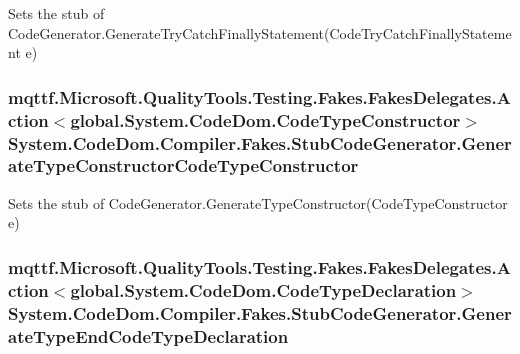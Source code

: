 Sets the stub of Code\-Generator.\-Generate\-Try\-Catch\-Finally\-Statement(\-Code\-Try\-Catch\-Finally\-Statement e)

\hypertarget{class_system_1_1_code_dom_1_1_compiler_1_1_fakes_1_1_stub_code_generator_a56afb5d726d0d976a47a78705684904e}{
\subsubsection[{Generate\-Type\-Constructor\-Code\-Type\-Constructor}]{\setlength{\rightskip}{0pt plus 5cm}mqttf.\-Microsoft.\-Quality\-Tools.\-Testing.\-Fakes.\-Fakes\-Delegates.\-Action$<$global.\-System.\-Code\-Dom.\-Code\-Type\-Constructor$>$ System.\-Code\-Dom.\-Compiler.\-Fakes.\-Stub\-Code\-Generator.\-Generate\-Type\-Constructor\-Code\-Type\-Constructor}}\label{class_system_1_1_code_dom_1_1_compiler_1_1_fakes_1_1_stub_code_generator_a56afb5d726d0d976a47a78705684904e}


Sets the stub of Code\-Generator.\-Generate\-Type\-Constructor(\-Code\-Type\-Constructor e)

\hypertarget{class_system_1_1_code_dom_1_1_compiler_1_1_fakes_1_1_stub_code_generator_ab9807daf0561fe1b74325ac47eb9f339}{
\subsubsection[{Generate\-Type\-End\-Code\-Type\-Declaration}]{\setlength{\rightskip}{0pt plus 5cm}mqttf.\-Microsoft.\-Quality\-Tools.\-Testing.\-Fakes.\-Fakes\-Delegates.\-Action$<$global.\-System.\-Code\-Dom.\-Code\-Type\-Declaration$>$ System.\-Code\-Dom.\-Compiler.\-Fakes.\-Stub\-Code\-Generator.\-Generate\-Type\-End\-Code\-Type\-Declaration}}\label{class_system_1_1_code_dom_1_1_compiler_1_1_fakes_1_1_stub_code_generator_ab9807daf0561fe1b74325ac47eb9f339}


